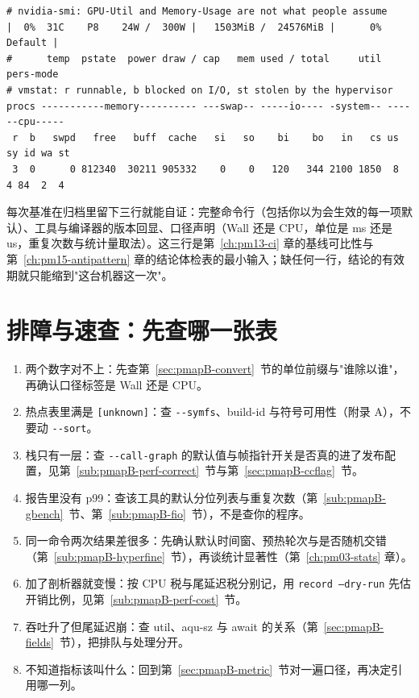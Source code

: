\documentclass[12pt,a4paper,fontset=fandol]{ctexbook}
\newcommand{\Tp}[1]{\texttt{#1}}
\newcommand{\Opt}[1]{\texttt{-\/-#1}}
\newcommand{\Lang}[1]{\textsf{#1}}
\newcommand{\MWall}{\Lang{Wall}}
\newcommand{\MCpu}{\Lang{CPU}}
\newcommand{\Mx}[1]{\textsf{#1}}
\begin{document}
\begin{lstlisting}[style=outstyle,caption={形态示意：\Tp{nvidia-smi} 与 \Tp{vmstat} 的关键列（非实测值）},label={lst:pmapB-dev}]
# nvidia-smi: GPU-Util and Memory-Usage are not what people assume
|  0%  31C    P8    24W /  300W |   1503MiB /  24576MiB |      0%      Default |
#      temp  pstate  power draw / cap   mem used / total     util   pers-mode
# vmstat: r runnable, b blocked on I/O, st stolen by the hypervisor
procs -----------memory---------- ---swap-- -----io---- -system-- ------cpu-----
 r  b   swpd   free   buff  cache   si   so    bi    bo   in   cs us sy id wa st
 3  0      0 812340  30211 905332    0    0   120   344 2100 1850  8  4 84  2  4
\end{lstlisting}

\begin{bestpractice}[title={把参数记录成可复核的三行}]
每次基准在归档里留下三行就能自证：完整命令行（包括你以为会生效的每一项默认）、工具与编译器的版本回显、口径声明（\MWall{} 还是 \MCpu{}，单位是 ms 还是 us，重复次数与统计量取法）。这三行是第~\ref{ch:pm13-ci} 章的基线可比性与第~\ref{ch:pm15-antipattern} 章的结论体检表的最小输入；缺任何一行，结论的有效期就只能缩到"这台机器这一次"。
\end{bestpractice}

\section{排障与速查：先查哪一张表}
\label{sec:pmapB-trouble}

\begin{enumerate}
\item 两个数字对不上：先查第~\ref{sec:pmapB-convert}~节的单位前缀与"谁除以谁"，再确认口径标签是 \MWall{} 还是 \MCpu{}。
\item 热点表里满是 \Tp{[unknown]}：查 \Opt{symfs}、build-id 与符号可用性（附录 A），不要动 \Opt{sort}。
\item 栈只有一层：查 \Opt{call-graph} 的默认值与帧指针开关是否真的进了发布配置，见第~\ref{sub:pmapB-perf-correct}~节与第~\ref{sec:pmapB-ccflag}~节。
\item 报告里没有 \Mx{p99}：查该工具的默认分位列表与重复次数（第~\ref{sub:pmapB-gbench}~节、第~\ref{sub:pmapB-fio}~节），不是查你的程序。
\item 同一命令两次结果差很多：先确认默认时间窗、预热轮次与是否随机交错（第~\ref{sub:pmapB-hyperfine}~节），再谈统计显著性（第~\ref{ch:pm03-stats} 章）。
\item 加了剖析器就变慢：按 CPU 税与尾延迟税分别记，用 \Tp{record --dry-run} 先估开销比例，见第~\ref{sub:pmapB-perf-cost}~节。
\item 吞吐升了但尾延迟崩：查 \Mx{util}、\Mx{aqu-sz} 与 \Mx{await} 的关系（第~\ref{sec:pmapB-fields}~节），把排队与处理分开。
\item 不知道指标该叫什么：回到第~\ref{sec:pmapB-metric}~节对一遍口径，再决定引用哪一列。
\end{enumerate}
\end{document}
